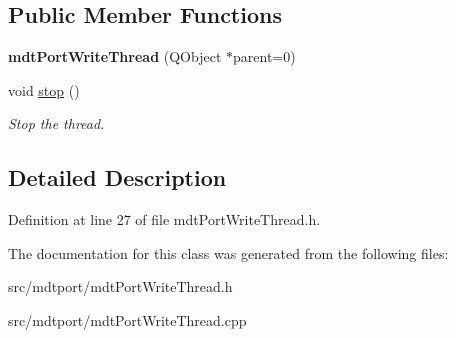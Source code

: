 \subsection*{Public Member Functions}
\begin{DoxyCompactItemize}
\item 
\hypertarget{classmdt_port_write_thread_a994b96eafdd721ccff2f2410a5abd5e3}{
{\bfseries mdtPortWriteThread} (QObject $\ast$parent=0)}
\label{classmdt_port_write_thread_a994b96eafdd721ccff2f2410a5abd5e3}

\item 
\hypertarget{classmdt_port_write_thread_a69702ab3a95c238fb451f866efc7cb34}{
void \hyperlink{classmdt_port_write_thread_a69702ab3a95c238fb451f866efc7cb34}{stop} ()}
\label{classmdt_port_write_thread_a69702ab3a95c238fb451f866efc7cb34}

\begin{DoxyCompactList}\small\item\em Stop the thread. \end{DoxyCompactList}\end{DoxyCompactItemize}


\subsection{Detailed Description}


Definition at line 27 of file mdtPortWriteThread.h.



The documentation for this class was generated from the following files:\begin{DoxyCompactItemize}
\item 
src/mdtport/mdtPortWriteThread.h\item 
src/mdtport/mdtPortWriteThread.cpp\end{DoxyCompactItemize}
